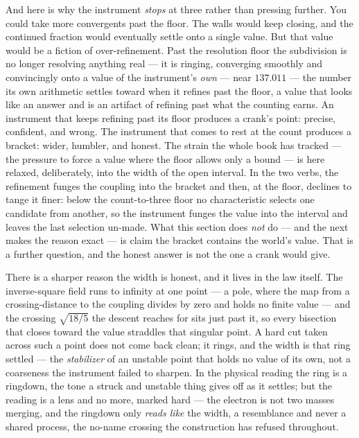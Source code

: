 And here is why the instrument \emph{stops} at three rather than pressing further. You could take more convergents past the
floor. The walls would keep closing, and the continued fraction would eventually settle onto a single value. But that value
would be a fiction of over-refinement. Past the resolution floor the subdivision is no longer resolving anything real --- it
is ringing, converging smoothly and convincingly onto a value of the instrument's \emph{own} --- near $137.011$ --- the
number its own arithmetic settles toward when it refines past the floor, a value that looks like an answer and is an artifact
of refining past what the counting earns. An instrument that keeps refining past its floor produces a crank's point: precise,
confident, and wrong. The instrument that comes to rest at the count produces a bracket: wider, humbler, and honest. The strain the whole book has tracked --- the pressure to
force a value where the floor allows only a bound --- is here relaxed, deliberately, into the width of the open interval. In
the two verbs, the refinement funges the coupling into the bracket and then, at the floor, declines to tange it finer: below
the count-to-three floor no characteristic selects one candidate from another, so the instrument funges the value into the
interval and leaves the last selection un-made. What this section does \emph{not} do --- and the next makes the reason
exact --- is claim the bracket contains the world's value. That is a further question, and the honest answer is not the one a
crank would give.

There is a sharper reason the width is honest, and it lives in the law itself. The inverse-square field runs to infinity
at one point --- a pole, where the map from a crossing-distance to the coupling divides by zero and holds no finite
value --- and the crossing $\sqrt{18/5}$ the descent reaches for sits just past it, so every bisection that closes toward
the value straddles that singular point. A hard cut taken across such a point does not come back clean; it rings, and the
width is that ring settled --- the \emph{stabilizer} of an unstable point that holds no value of its own, not a coarseness
the instrument failed to sharpen. In the physical reading the ring is a ringdown, the tone a struck and unstable thing
gives off as it settles; but the reading is a lens and no more, marked hard --- the electron is not two masses merging,
and the ringdown only \emph{reads like} the width, a resemblance and never a shared process, the no-name crossing the
construction has refused throughout.

